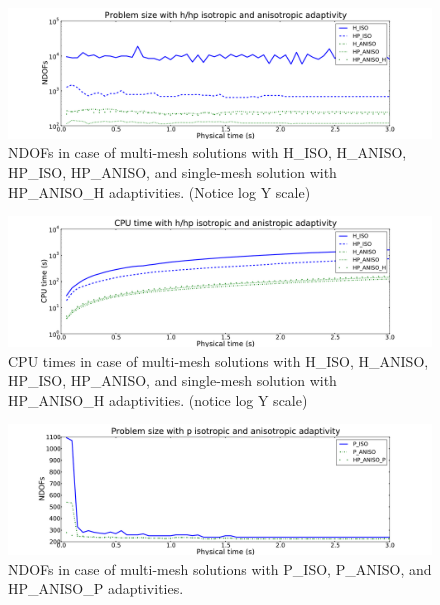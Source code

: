 \begin{figure}
  \begin{centering}
  \includegraphics[width=\columnwidth]{isoaniso_dof}
  \caption{\label{fig:isoanisodof} NDOFs in case 
  of multi-mesh solutions with H\_ISO, H\_ANISO,
  HP\_ISO, HP\_ANISO, and single-mesh solution with HP\_ANISO\_H
  adaptivities. (Notice log Y scale)}
  \end{centering}
\end{figure}
\begin{figure}
  \begin{centering}
  \includegraphics[width=\columnwidth]{isoaniso_cpu}
  \caption{\label{fig:isoanisocpu} CPU times in case 
  of multi-mesh solutions with H\_ISO, H\_ANISO,
  HP\_ISO, HP\_ANISO, and single-mesh solution with HP\_ANISO\_H
  adaptivities. (notice log Y scale)}
  \end{centering}
\end{figure}
\begin{figure}
  \begin{centering}
  \includegraphics[width=\columnwidth]{isoanisop_dof}
  \caption{\label{fig:isoanisopdof} NDOFs in case 
  of multi-mesh solutions with P\_ISO, P\_ANISO, and
  HP\_ANISO\_P adaptivities.}
  \end{centering}
\end{figure}
